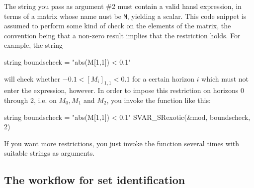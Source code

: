\documentclass[a4paper,10pt]{article}
\begin{document}
The string you pass as argument \#2 must contain a valid hansl
expression, in terms of a matrix whose name nust be \texttt{M},
yielding a scalar. This code snippet is assumed to perform some kind
of check on the elements of the matrix, the convention being that a
non-zero result implies that the restriction holds. For example, the
string
\begin{code}
string boundscheck = "abs(M[1,1]) < 0.1"
\end{code}
will check whether $-0.1 < [M_i]_{1,1} < 0.1$ for a certain horizon $i$
which must not enter the expression, however. In order to impose
this restriction on horizons 0 through 2, i.e. on $M_0, M_1$ and $M_2$,
you invoke the function like this:
\begin{code}
string boundscheck = "abs(M[1,1]) < 0.1"
SVAR_SRexotic(&mod, boundscheck, 2)
\end{code}

If you want more restrictions, you just invoke the function several times
with suitable strings as arguments.


\subsection{The workflow for set identification}
\end{document}
